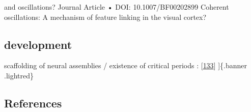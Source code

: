 and oscillations? Journal Article • DOI: 10.1007/BF00202899 Coherent oscillations: A mechanism of feature linking in the visual cortex?

\hypertarget{development}{%
\subsection{development}\label{development}}

scaffolding of neural assemblies / existence of critical periods : {[}\protect\hyperlink{ref-1HSyNOl48}{133}{]}
{]}\{.banner .lightred\}

\hypertarget{references}{%
\subsection{References}\label{references}}

